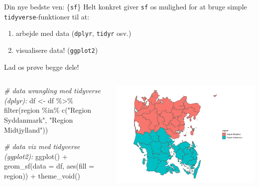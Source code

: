 \documentclass[
  8pt,
  ignorenonframetext,
  aspectratio=169]{beamer}
\newenvironment{Shaded}{}{}
\newcommand{\AttributeTok}[1]{\textcolor[rgb]{0.49,0.56,0.16}{#1}}
\newcommand{\CommentTok}[1]{\textcolor[rgb]{0.38,0.63,0.69}{\textit{#1}}}
\newcommand{\FunctionTok}[1]{\textcolor[rgb]{0.02,0.16,0.49}{#1}}
\newcommand{\NormalTok}[1]{#1}
\newcommand{\OtherTok}[1]{\textcolor[rgb]{0.00,0.44,0.13}{#1}}
\newcommand{\SpecialCharTok}[1]{\textcolor[rgb]{0.25,0.44,0.63}{#1}}
\newcommand{\StringTok}[1]{\textcolor[rgb]{0.25,0.44,0.63}{#1}}
\newcommand{\columnsbegin}{\begin{columns}}
\newcommand{\columnsend}{\end{columns}}
\begin{document}
\begin{frame}[fragile]{Din nye bedste ven: \{\texttt{sf}\}}
\protect\hypertarget{din-nye-bedste-ven-sf-1}{}
Helt konkret giver \texttt{sf} os mulighed for at bruge simple
\texttt{tidyverse}-funktioner til at:

\begin{enumerate}
\item
  arbejde med data (\texttt{dplyr}, \texttt{tidyr} osv.)
\item
  visualisere data! (\texttt{ggplot2})
\end{enumerate}

Lad os prøve begge dele!

\columnsbegin
{}

\tiny

\begin{Shaded}
\begin{Highlighting}[]
\CommentTok{\# data wrangling med tidyverse (dplyr):}
\NormalTok{df }\OtherTok{\textless{}{-}}\NormalTok{ df }\SpecialCharTok{\%\textgreater{}\%} 
  \FunctionTok{filter}\NormalTok{(region }\SpecialCharTok{\%in\%} \FunctionTok{c}\NormalTok{(}\StringTok{"Region Syddanmark"}\NormalTok{, }\StringTok{"Region Midtjylland"}\NormalTok{))}

\CommentTok{\# data viz med tidyverse (ggplot2):}
\FunctionTok{ggplot}\NormalTok{() }\SpecialCharTok{+}
  \FunctionTok{geom\_sf}\NormalTok{(}\AttributeTok{data =}\NormalTok{ df, }\FunctionTok{aes}\NormalTok{(}\AttributeTok{fill =}\NormalTok{ region)) }\SpecialCharTok{+}
  \FunctionTok{theme\_void}\NormalTok{()}
\end{Highlighting}
\end{Shaded}

\normalsize


\tiny

\includegraphics{crashcourse_slides_files/figure-beamer/unnamed-chunk-12-1.pdf}

\normalsize \columnsend
\end{frame}
\end{document}
